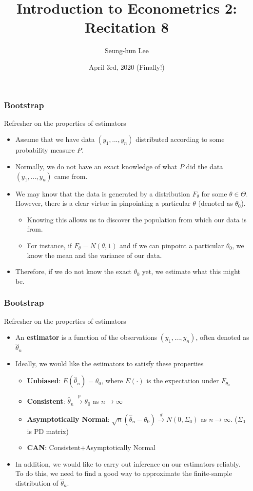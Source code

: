 \documentclass{beamer}
\title[Econometrics 2]{Introduction to Econometrics 2: Recitation 8} %
\author{Seung-hun Lee}
\institute{Columbia University}
\date{April 3rd, 2020 (Finally!)}
\begin{document}
\begin{frame}
\titlepage
\end{frame}


\begin{frame}
\frametitle{Bootstrap}
Refresher on the properties of estimators
\begin{itemize}
\item Assume that we have data $(y_1,...,y_n)$ distributed according to some probability measure $P$.
\item Normally, we do not have an exact knowledge of what $P$ did the data $(y_1,...,y_n)$ came from. 
\item We may know that the data is generated by a distribution $F_\theta$ for some $\theta\in\Theta$. However, there is a clear virtue in pinpointing a particular $\theta$ (denoted as $\theta_0$).
\begin{itemize}
\item Knowing this allows us to discover the population from which our data is from. 
\item For instance, if $F_\theta = N(\theta,1)$ and if we can pinpoint a particular $\theta_0$, we know the mean and the variance of our data.
\end{itemize}
\item Therefore, if we do not know the exact $\theta_0$ yet, we estimate what this might be. 
\end{itemize}
\end{frame}

\begin{frame}
\frametitle{Bootstrap}
Refresher on the properties of estimators
\begin{itemize}
\item An \textbf{estimator} is a function of the observations $(y_1,...,y_n)$, often denoted as $\hat{\theta}_n$
\item Ideally, we would like the estimators to satisfy these properties
\begin{itemize}
\item \textbf{Unbiased}: $E(\hat{\theta}_n)=\theta_0$, where $E(\cdot)$ is the expectation under $F_{\theta_0}$
\item \textbf{Consistent}: $\hat{\theta}_n\xrightarrow{p} \theta_0$ as $n\to\infty$
\item \textbf{Asymptotically Normal}: $\sqrt{n}(\hat{\theta}_n-\theta_0) \xrightarrow{d} N(0,\Sigma_0)$ as $n\to\infty$. ($\Sigma_0$ is PD matrix)
\item \textbf{CAN}: Consistent+Asymptotically Normal
\end{itemize}
\item In addition, we would like to carry out inference on our estimators reliably. To do this, we need to find a good way to approximate the finite-sample distribution of $\hat{\theta}_n$. 
\end{itemize}
\end{frame}
\end{document}

